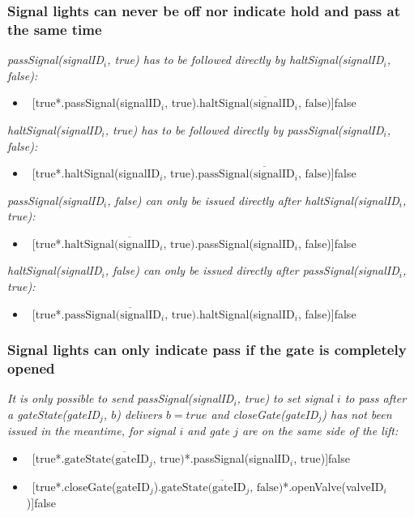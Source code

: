 \subsubsection{Signal lights can never be off nor indicate hold and pass at the same time}
\textit{passSignal(signalID$_i$, true) has to be followed directly by haltSignal(signalID$_i$, false):}
	\begin{itemize}
		\item ~[true*.passSignal(signalID$_i$, true).$\overline{\textrm{haltSignal(signalID$_i$, false)}}$]false
	\end{itemize}
\textit{haltSignal(signalID$_i$, true) has to be followed directly by passSignal(signalID$_i$, false):}
	\begin{itemize}
		\item ~[true*.haltSignal(signalID$_i$, true).$\overline{\textrm{passSignal(signalID$_i$, false)}}$]false
	\end{itemize}
\textit{passSignal(signalID$_i$, false) can only be issued directly after haltSignal(signalID$_i$, true):}
	\begin{itemize}
		\item ~[true*.$\overline{\textrm{haltSignal(signalID$_i$, true)}}$.passSignal(signalID$_i$, false)]false
	\end{itemize}
\textit{haltSignal(signalID$_i$, false) can only be issued directly after passSignal(signalID$_i$, true):}
	\begin{itemize}
		\item ~[true*.$\overline{\textrm{passSignal(signalID$_i$, true)}}$.haltSignal(signalID$_i$, false)]false
	\end{itemize}

\subsubsection{Signal lights can only indicate pass if the gate is completely opened}
\textit{It is only possible to send passSignal(signalID$_i$, true) to set signal $i$ to pass after a gateState(gateID$_j$, $ b $) delivers $b = true$ and closeGate(gateID$_j$) has not been issued in the meantime, for signal $i$ and gate $j$ are on the same side of the lift:}
	\begin{itemize}
		\item ~[true*.$\overline{\textrm{gateState(gateID$_j$, true)}}$*.passSignal(signalID$_i$, true)]false
		\item ~[true*.closeGate(gateID$_j$).$\overline{\textrm{gateState(gateID$_j$, false)}}$*.openValve(valveID$_i$)]false
	\end{itemize}
	
